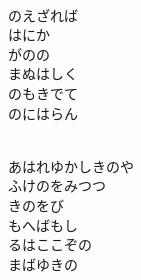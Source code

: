 \documentclass[10pt,b5j]{tarticle} %
\begin{document}
\begin{enumerate}
\begin{minipage}[c]{\blocksize}
        \vspace{\linespace}
        \item~\\
        のえざれば\\
        はにか\\
        がのの\\
        まぬはしく\\
        のもきでて\\
        のにはらん
        
    \end{minipage}
    \begin{minipage}[c]{\blocksize}
        
        \vspace{\linespace}
        \item~\\
        あはれゆかしきのや\\
        ふけのをみつつ\\
        きのをび\\
        もへばもし\\
        るはここぞの\\
        まばゆきの
    
    \end{minipage}
\end{enumerate} %
\end{document}
